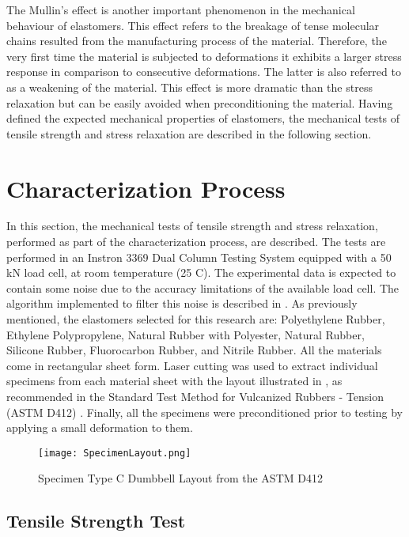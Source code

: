 The Mullin's effect is another important phenomenon in the mechanical behaviour of elastomers. This effect refers to the breakage of tense molecular chains resulted from the manufacturing process of the material. Therefore, the very first time the material is subjected to deformations it exhibits a larger stress response in comparison to consecutive deformations. The latter is also referred to as a weakening of the material. This effect is more dramatic than the stress relaxation but can be easily avoided when preconditioning the material. Having defined the expected mechanical properties of elastomers, the mechanical tests of tensile strength and stress relaxation are described in the following section.

\section{Characterization Process} \label{sec:CharacterizationProcess}

In this section, the mechanical tests of tensile strength and stress relaxation, performed as part of the characterization process, are described. The tests are performed in an Instron 3369 Dual Column Testing System equipped with a 50 kN load cell, at room temperature (25 \degree{} C). The experimental data is expected to contain some noise due to the accuracy limitations of the available load cell. The algorithm implemented to filter this noise is described in  . As previously mentioned, the elastomers selected for this research are: Polyethylene Rubber, Ethylene Polypropylene, Natural Rubber with Polyester, Natural Rubber, Silicone Rubber, Fluorocarbon Rubber, and Nitrile Rubber. All the materials come in rectangular sheet form. Laser cutting was used to extract individual specimens from each material sheet with the layout illustrated in , as recommended in the Standard Test Method for Vulcanized Rubbers - Tension (ASTM D412) \cite{astmd412}. Finally, all the specimens were preconditioned prior to testing by applying a small deformation to them.

\begin{figure}[htb!]
    \centering
    \texttt{[image: SpecimenLayout.png]}
    \caption{Specimen Type C Dumbbell Layout from the ASTM D412 \cite{astmd412}}
    \label{fig:specimenLayout}
\end{figure}

\subsection{Tensile Strength Test}

